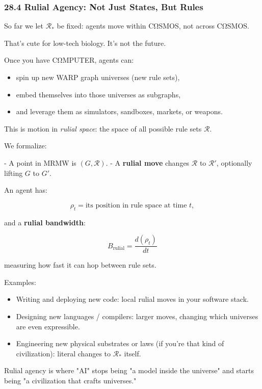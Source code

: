 \subsubsection*{28.4  Rulial Agency: Not Just States, But Rules}

So far we let $\mathcal{R}_\ast$ be fixed: agents move within CΩSMOS, not across CΩSMOS.

That’s cute for low-tech biology. It’s not the future.

Once you have CΩMPUTER, agents can:

\begin{itemize}
  \item spin up new WARP graph universes (new rule sets),
  \item embed themselves into those universes as subgraphs,
  \item and leverage them as simulators, sandboxes, markets, or weapons.
\end{itemize}

This is motion in \emph{rulial space}: the space of all possible rule sets $\mathcal{R}$.

We formalize:

- A point in MRMW is $(G,\mathcal{R})$.
- A \textbf{rulial move} changes $\mathcal{R}$ to $\mathcal{R}'$, optionally lifting $G$ to $G'$.

An agent has:

\[
  \rho_t = \text{its position in rule space at time } t,
\]

and a \textbf{rulial bandwidth}:

\[
  B_\text{rulial} = \frac{d(\rho_t)}{dt}
\]

measuring how fast it can hop between rule sets.

Examples:

\begin{itemize}
  \item Writing and deploying new code: local rulial moves in your software stack.
  \item Designing new languages / compilers: larger moves, changing which universes are even expressible.
  \item Engineering new physical substrates or laws (if you’re that kind of civilization): literal changes to $\mathcal{R}_\ast$ itself.
\end{itemize}

Rulial agency is where "AI" stops being "a model inside the universe" and
starts being "a civilization that crafts universes."

